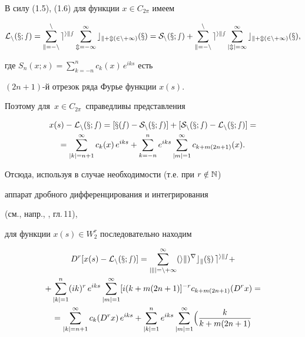 \begin{pf} В силу (1.5), (1.6) для функции $x\in C_{2\pi}$ имеем


\begin{equation}


\cal {L}_n(x;s)=\sum_{k=-n}^ne^{iks}\sum_{m=-\infty}^\infty


c_{k+m(2n+1)}(x)=


S_n(x;s) +\sum_{k=-n}^ne^{iks}\sum_{|m|=1}^\infty c_{k+m(2n+1)}(x),


\end{equation}


где $S_n(x;s) =\sum_{k=-n}^nc_k(x)\, e^{iks}$ есть


$(2n+1)$-й отрезок ряда Фурье функции $x(s)$.


Поэтому для $\, x\in C_{2\pi}\, $ справедливы представления


\begin{gather}


x(s)-\cal {L}_n(x;s)=[x(s)-S_n(x;s)] +[S_n(x;s)-\cal{L}_n(x;s)]=\notag\\


%


=\sum_{|k|=n+1}^\infty c_k(x)\, e^{iks}+


\sum_{k=-n}^ne^{iks}\sum_{|m|=1}^\infty c_{k+m(2n+1)}(x).


\end{gather}


Отсюда, используя в случае необходимости (т.е. при $r \notin \Bbb{N}$)


аппарат дробного дифференцирования и интегрирования


(см., напр., \cite{Zy}, гл.\,11),


для функции $x(s)\in W_2^r$ последовательно находим


\begin{gather}


D^r[x(s)-\cal{L}_n(x;s)]=\sum_{|k|=n+1}^\infty (ik)^rc_k(x)\,


e^{iks}+\notag\\


%


+ \sum_{|k|=1}^n(ik)^r\,e^{iks} \sum_{|m|=1}^\infty [i(k+m(2n+1)]^{-r}


c_{k+m(2n+1)}(D^rx)=\notag\\


%


= \sum_{|k|=n+1}^\infty c_k(D^rx)\, e^{iks} +


\sum_{|k|=1}^ne^{iks}\sum_{|m|=1}^\infty \Bigl( \frac{k}{k+m(2n+1)}



\end{gather}
\end{pf}
